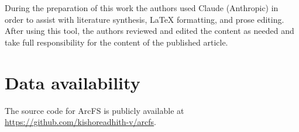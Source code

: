\documentclass[5p,times]{elsarticle}
\begin{document}
During the preparation of this work the authors used Claude (Anthropic)
in order to assist with literature synthesis, \LaTeX{} formatting, and
prose editing. After using this tool, the authors reviewed and edited
the content as needed and take full responsibility for the content of
the published article.

\section*{Data availability}

The source code for ArcFS is publicly available at
\url{https://github.com/kishoreadhith-v/arcfs}.



\end{document}
